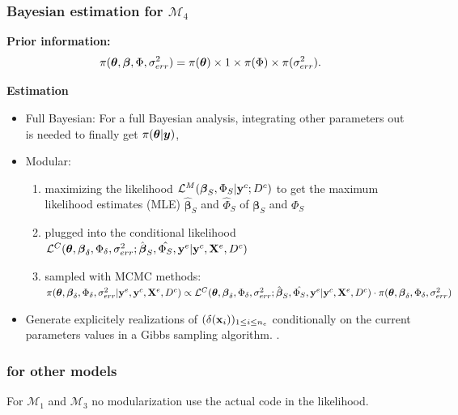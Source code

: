\documentclass[nopagenumber,9pt]{beamer}
\begin{document}
\begin{frame}
 \frametitle{Bayesian estimation for $\mathcal{M}_4$}
 \textbf{Prior information:} \begin{equation*}
\pi(\boldsymbol{\theta},\boldsymbol{\beta},\Phi,\sigma^2_{err}) = \pi(\boldsymbol{\theta}) \times 1 \times \pi(\Phi)\times \pi(\sigma^2_{err}).
\label{eq:PriorDistribution}
\end{equation*}


\textbf{Estimation}


\begin{itemize}
 \item Full Bayesian: 
For a full Bayesian analysis, integrating other parameters out is needed to finally get $\pi(\boldsymbol{\theta}|\boldsymbol{y})$,
\item Modular: 
\begin{enumerate}
 \item maximizing the likelihood $\mathcal{L}^M(\boldsymbol{\beta}_S,\Phi_S|\mathbf{y}^c;D^c)$  to get the maximum likelihood estimates (MLE) $\hat{\boldsymbol{\beta}}_S$ and $\hat{\Phi}_S$ of $\boldsymbol{\beta}_S$ and $\Phi_S$
 \item plugged into the conditional likelihood $\mathcal{L}^C(\boldsymbol{\theta},\boldsymbol{\beta}_{\delta},\Phi_{\delta},\sigma^2_{err}; \hat{\boldsymbol{\beta}}_S,\hat{\Phi_S},\mathbf{y}^{e}|\mathbf{y}^c,\mathbf{X}^e,D^c)$
 \item  sampled with MCMC methods:\\ $\pi(\boldsymbol{\theta},\boldsymbol{\beta}_\delta,\Phi_\delta,\sigma^2_{err}|\mathbf{y}^{e},\mathbf{y}^c,\mathbf{X}^e,D^c)\propto  \mathcal{L}^C(\boldsymbol{\theta},\boldsymbol{\beta}_{\delta},\Phi_{\delta},\sigma^2_{err};\hat{\boldsymbol{\beta}}_S,\hat{\Phi_S},\mathbf{y}^{e}|\mathbf{y}^c,\mathbf{X}^e,D^c)\cdot \pi(\boldsymbol{\theta},\boldsymbol{\beta}_\delta,\Phi_\delta,\sigma^2_{err})$
\end{enumerate}

\item Generate explicitely realizations of $(\delta(\mathbf{x}_i))_{1\le i\le n_e}$ conditionally on the current parameters values in a Gibbs sampling algorithm.
\cite{bayarri2007}.%


\end{itemize}


\end{frame}



\begin{frame}
 \frametitle{for other models}
 For $\mathcal{M}_1$ and $\mathcal{M}_3$ no modularization use the actual code in the likelihood.
 
 
 
\end{frame}
\end{document}
